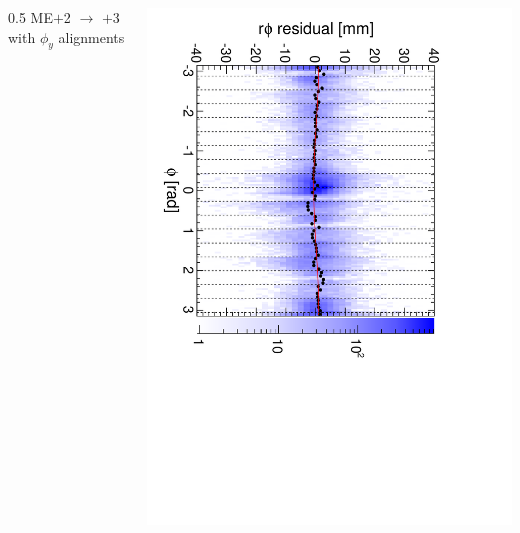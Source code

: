 \documentclass[compress]{beamer}
\begin{document}
\begin{frame}
\begin{columns}
{0.5\linewidth}
\centering ME$+$2 $\to$ $+$3 with $\phi_y$ alignments

\includegraphics[height=\linewidth, angle=90]{diskiter02_p2to3.pdf}
\end{columns}
\end{frame}
\end{document}
